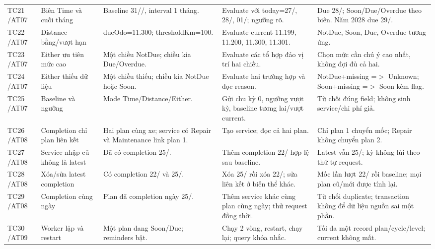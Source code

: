 \begin{smalltable}
\begin{longtable}{L{1.2cm}L{2.5cm}L{3.6cm}L{3.6cm}L{3.7cm}}
TC21 /\allowbreak  AT07 & Biên Time và cuối tháng & Baseline 31//,  interval 1 tháng. & Evaluate với today=27/, 28/, 01/; ngưỡng rõ. & Due 28/; Soon/\allowbreak Due/\allowbreak Overdue theo biên. Năm 2028 due 29/.\\
TC22 /\allowbreak  AT07 & Distance bằng/\allowbreak vượt hạn & dueOdo=11.300; thresholdKm=100. & Evaluate current 11.199, 11.200, 11.300, 11.301. & NotDue,  Soon,  Due,  Overdue tương ứng.\\
TC23 /\allowbreak  AT07 & Either ưu tiên mức cao & Một chiều NotDue; chiều kia Due/\allowbreak Overdue. & Evaluate các tổ hợp đảo vị trí hai chiều. & Chọn mức cần chú ý cao nhất,  không đợi đủ cả hai.\\
TC24 /\allowbreak  AT07 & Either thiếu dữ liệu & Một chiều thiếu; chiều kia NotDue hoặc Soon. & Evaluate hai trường hợp và đọc reason. & NotDue+\allowbreak missing =$>$ Unknown; Soon+\allowbreak missing =$>$ Soon kèm flag.\\
TC25 /\allowbreak  AT07 & Baseline và ngưỡng & Mode Time/\allowbreak Distance/\allowbreak Either. & Gửi chu kỳ 0,  ngưỡng vượt kỳ,  baseline tương lai/\allowbreak vượt current. & Từ chối đúng field; không sinh service/\allowbreak chi phí giả.\\
TC26 /\allowbreak  AT08 & Completion chỉ plan liên kết & Hai plan cùng xe; service có Repair và Maintenance link plan 1. & Tạo service; đọc cả hai plan. & Chỉ plan 1 chuyển mốc; Repair không chuyển plan 2.\\
TC27 /\allowbreak  AT08 & Service nhập cũ không là latest & Đã có completion 25/. & Thêm completion 22/ hợp lệ sau baseline. & Latest vẫn 25/; kỳ không lùi theo thứ tự request.\\
TC28 /\allowbreak  AT08 & Xóa/\allowbreak sửa latest completion & Có completion 22/ và 25/. & Xóa 25/ rồi xóa 22/; sửa liên kết ở biến thể khác. & Mốc lần lượt 22/ rồi baseline; mọi plan cũ/\allowbreak mới được tính lại.\\
TC29 /\allowbreak  AT08 & Completion cùng ngày & Plan đã completion ngày 25/. & Thêm service khác cùng plan cùng ngày; thử request đồng thời. & Từ chối duplicate; transaction không để dữ liệu nguồn sai một phần.\\
TC30 /\allowbreak  AT09 & Worker lặp và restart & Một plan đang Soon/\allowbreak Due; reminders bật. & Chạy 2 vòng,  restart,  chạy lại; query khóa nhắc. & Tối đa một record plan/\allowbreak cycle/\allowbreak level; current không mất.\\

\end{longtable}
\end{smalltable}
